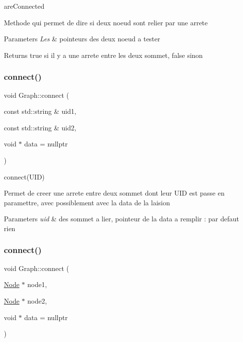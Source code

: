 are\+Connected 

Methode qui permet de dire si deux noeud sont relier par une arrete


\begin{DoxyParams}{Parameters}
{\em Les} & pointeurs des deux noeud a tester \\
\hline
\end{DoxyParams}
\begin{DoxyReturn}{Returns}
true si il y a une arrete entre les deux sommet, false sinon 
\end{DoxyReturn}
\mbox{\label{class_graph_a6f487be56c6a426443caa718e33c5399}} 
\subsubsection{\texorpdfstring{connect()}{connect()}\hspace{0.1cm}{\footnotesize\ttfamily [1/2]}}
{\footnotesize\ttfamily void Graph\+::connect (\begin{DoxyParamCaption}\item[{const std\+::string \&}]{uid1,  }\item[{const std\+::string \&}]{uid2,  }\item[{void $\ast$}]{data = {\ttfamily nullptr} }\end{DoxyParamCaption})}



connect(\+U\+I\+D) 

Permet de creer une arrete entre deux sommet dont leur U\+ID est passe en paramettre, avec possiblement avec la data de la laision


\begin{DoxyParams}{Parameters}
{\em uid} & des sommet a lier, pointeur de la data a remplir \+: par defaut rien \\
\hline
\end{DoxyParams}
\mbox{\label{class_graph_afedc0da07ed8ca06cf07f202dd83cec4}} 
\subsubsection{\texorpdfstring{connect()}{connect()}\hspace{0.1cm}{\footnotesize\ttfamily [2/2]}}
{\footnotesize\ttfamily void Graph\+::connect (\begin{DoxyParamCaption}\item[{\mbox{\hyperlink{class_node}{Node}} $\ast$}]{node1,  }\item[{\mbox{\hyperlink{class_node}{Node}} $\ast$}]{node2,  }\item[{void $\ast$}]{data = {\ttfamily nullptr} }\end{DoxyParamCaption})}



